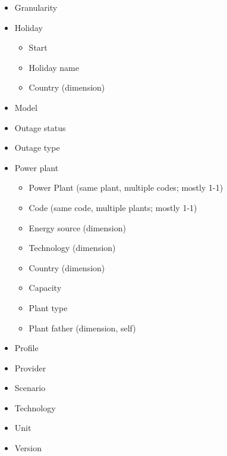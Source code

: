 \begin{itemize}
    \item Granularity
    
    \item Holiday
    \begin{itemize}
        \item Start
        \item Holiday name
        \item Country (dimension)
    \end{itemize}
    
    \item Model
    
    \item Outage status
    
    \item Outage type
    
    \item Power plant
    \begin{itemize}
        \item Power Plant (same plant, multiple codes; mostly 1-1)
        \item Code (same code, multiple plants; mostly 1-1)
        \item Energy source (dimension)
        \item Technology (dimension)
        \item Country (dimension)
        \item Capacity
        \item Plant type
        \item Plant father (dimension, self)
    \end{itemize}
    
    \item Profile
    
    \item Provider
    
    \item Scenario
    
    \item Technology
    
    \item Unit
    
    \item Version
\end{itemize} 